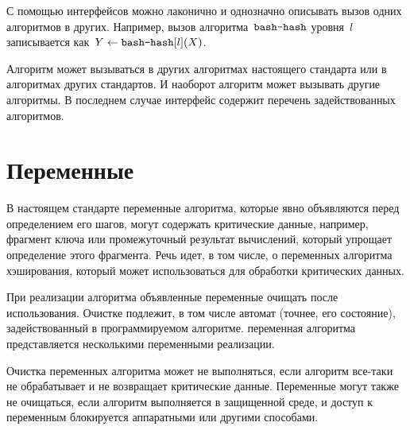 С помощью интерфейсов можно лаконично и однозначно 
описывать вызов одних алгоритмов в других.
%        	
Например, вызов алгоритма~$\texttt{bash-hash}$ уровня~$l$
записывается как~$Y\leftarrow\texttt{bash-hash}[l](X)$.

Алгоритм может вызываться в других алгоритмах настоящего стандарта или 
в алгоритмах других стандартов. И наоборот алгоритм может вызывать другие 
алгоритмы. В последнем случае интерфейс содержит перечень задействованных 
алгоритмов.

\section{Переменные}\label{COMMON.Vars}

В настоящем стандарте переменные алгоритма, которые явно объявляются перед 
определением его шагов, могут содержать критические данные, например, фрагмент 
ключа или промежуточный результат вычислений, который упрощает определение 
этого фрагмента.
%
Речь идет, в том числе, о переменных алгоритма хэширования, 
который может использоваться для обработки критических данных.

При реализации алгоритма объявленные переменные  очищать после
использования. 
%
Очистке подлежит, в том числе автомат (точнее, его состояние), 
задействованный в программируемом алгоритме.
%
 переменная алгоритма представляется
несколькими переменными реализации.

Очистка переменных алгоритма может не выполняться, если алгоритм все-таки 
не обрабатывает и не возвращает критические данные.
%
Переменные могут также не очищаться, если алгоритм выполняется в защищенной 
среде, и доступ к переменным блокируется аппаратными или другими способами.



